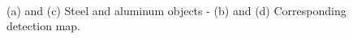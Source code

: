 \begin{figure}
  \centering
	

  \hspace*{\fill}
   \hfill
  \hspace*{\fill} \\ \hspace*{\fill}
   \hfill
  \hspace*{\fill}
	
	  \caption{(a) and (c) Steel and aluminum objects - (b) and (d) Corresponding detection map.}
		\label{fig:6}
		\end{figure}
